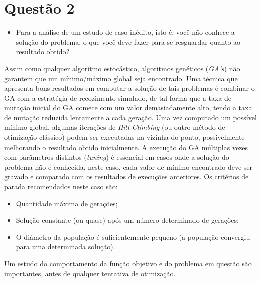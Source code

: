 \documentclass[a4paper, 11pt]{article}
\begin{document}
\section*{Questão 2}
\begin{itemize}
\item Para a análise de um estudo de caso inédito, isto é, você não conhece a solução do problema, o que você
deve fazer para se resguardar quanto ao resultado obtido?
\end{itemize}
Assim como qualquer algoritmo estocástico, algoritmos genéticos (\textit{GA's}) não garantem que um mínimo/máximo global	seja encontrado. Uma técnica que apresenta bons resultados em computar a solução de tais problemas é combinar o GA com a estratégia de recozimento simulado, de tal forma que a taxa de mutação inicial do GA comece com um valor demasiadamente alto, tendo a taxa de mutação reduzida lentamente a cada geração.\newline
Uma vez computado um possível mínimo global, algumas iterações de \textit{Hill Climbing} (ou outro método de otimização clássico) podem ser executadas na vizinha do ponto, possivelmente melhorando o resultado obtido inicialmente.\newline
A execução do GA múltiplas vezes com parâmetros distintos (\textit{tuning}) é essencial em casos onde a solução do problema não é conhecida, neste caso, cada valor de mínimo encontrado deve ser gravado e comparado com os resultados de execuções anteriores. Os critérios de parada recomendados neste caso são:
\begin{itemize}
\item Quantidade máxima de gerações;
\item Solução constante (ou quase) após um número determinado de gerações;
\item O diâmetro da população é suficientemente pequeno (a população convergiu para uma determinada solução).
\end{itemize}
Um estudo do comportamento da função objetivo e do problema em questão são importantes, antes de qualquer tentativa de otimização.
\end{document}
